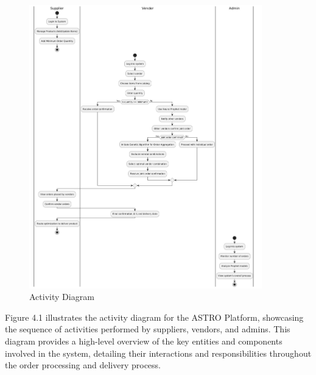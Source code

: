 \begin{figure}[H]
    \centering
    \includegraphics[width=0.9\textwidth]{Figures/Activity diagram.jpeg}
    \caption{Activity Diagram}
    \label{fig:activity-diagram}
\end{figure}
\noindent Figure 4.1 illustrates the activity diagram for the ASTRO Platform, showcasing the sequence of activities performed by suppliers, vendors, and admins. This diagram provides a high-level overview of the key entities and components involved in the system, detailing their interactions and responsibilities throughout the order processing and delivery process.

